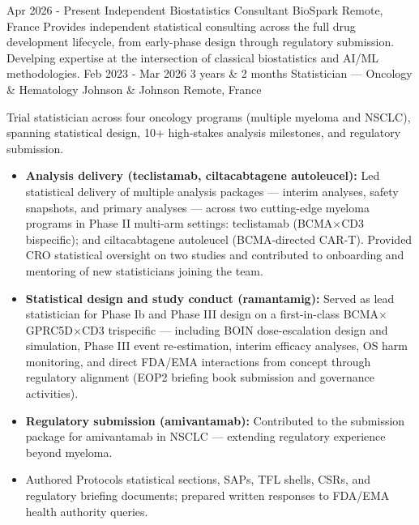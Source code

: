\vspace*{.2em}
\begin{experiences}
\imageexperience
{Apr 2026 - Present}
{}
{Independent Biostatistics Consultant}
{BioSpark}
{Remote, France}
{}
{\vspace*{-2em}
Provides independent statistical consulting across the full drug development
 lifecycle, from early-phase design through regulatory submission. Develping
 expertise at the intersection of classical biostatistics and AI/ML methodologies.
}
{}
\emptySeparator
\imageexperience
{Feb 2023 - Mar 2026}
{3 years \& 2 months}
{Statistician --- Oncology \& Hematology}
{Johnson \& Johnson}
{Remote, France}
{}
{\vspace*{-2em}
Trial statistician across four oncology programs (multiple myeloma and NSCLC),
 spanning statistical design, 10+ high-stakes analysis milestones, and regulatory
  submission.
\begin{itemize}
\item \textbf{Analysis delivery (teclistamab, ciltacabtagene autoleucel):} 
Led statistical delivery of multiple analysis packages --- interim analyses,
 safety snapshots, and primary analyses --- across two cutting-edge myeloma
  programs in Phase II multi-arm settings: teclistamab
   (BCMA$\times$CD3 bispecific); and ciltacabtagene autoleucel
     (BCMA-directed CAR-T). Provided CRO statistical oversight on two studies and contributed to onboarding and mentoring of new statisticians joining the team.
\item \textbf{Statistical design and study conduct (ramantamig):} Served as lead
 statistician for Phase Ib and Phase III design on a first-in-class 
 BCMA$\times$GPRC5D$\times$CD3 trispecific --- including BOIN dose-escalation 
 design and simulation, Phase III event re-estimation, interim efficacy analyses,
  OS harm monitoring, and direct FDA/EMA interactions from concept through
   regulatory alignment (EOP2 briefing book submission and governance activities).
\item \textbf{Regulatory submission (amivantamab):} Contributed to the submission
 package for amivantamab in NSCLC --- extending regulatory experience beyond
  myeloma.
\item Authored Protocols statistical sections, SAPs, TFL shells, CSRs, and regulatory briefing documents; prepared written responses to FDA/EMA health authority queries.
\end{itemize}
}
\end{experiences}
